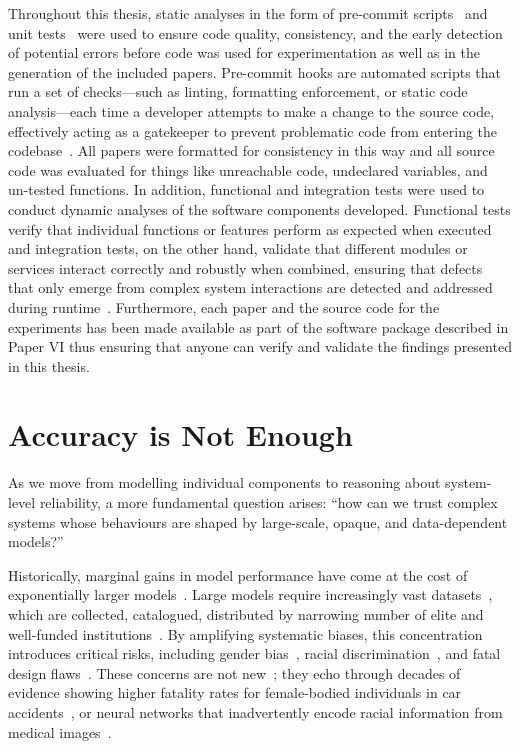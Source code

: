 Throughout this thesis, static analyses in the form of pre-commit scripts~\cite{precommit} and unit tests~\cite{testautomation} were used to ensure code quality, consistency, and the early detection of potential errors before code was used for experimentation as well as in the generation of the included papers. 
Pre-commit hooks are automated scripts that run a set of checks---such as linting, formatting enforcement, or static code analysis---each time a developer attempts to make a change to the source code, effectively acting as a gatekeeper to prevent problematic code from entering the codebase~\cite{precommit}.
All papers were formatted for consistency in this way and all source code was evaluated for things like unreachable code, undeclared variables, and un-tested functions.
In addition, functional and integration tests were used to conduct dynamic analyses of the software components developed. 
Functional tests verify that individual functions or features perform as expected when executed and integration tests, on the other hand, validate that different modules or services interact correctly and robustly when combined, ensuring that defects that only emerge from complex system interactions are detected and addressed during runtime~\cite{wang2006software}.
Furthermore, each paper and the source code for the experiments has been made available as part of the software package described in Paper VI thus ensuring that anyone can verify and validate the findings presented in this thesis. 

\section{Accuracy is Not Enough}

As we move from modelling individual components to reasoning about system-level reliability, a more fundamental question arises: ``how can we trust complex systems whose behaviours are shaped by large-scale, opaque, and data-dependent models?''

Historically, marginal gains in model performance have come at the cost of exponentially larger models~\cite{desislavov2021compute}. 
Large models require increasingly vast datasets~\cite{desislavov2021compute,vapnik1994measuring,blumer1989learnability}, which are collected, catalogued, distributed by narrowing number of elite and well-funded institutions~\cite{koch2021reduced}. 
By amplifying systematic biases, this concentration introduces critical risks, including gender bias~\cite{lu2020gender}, racial discrimination~\cite{buolamwini2018gender}, and fatal design flaws~\cite{banks2018driver}. 
These concerns are not new~\cite{corsaro1982something,ramirez2000resource,buolamwini2018gender}; they echo through decades of evidence showing higher fatality rates for female-bodied individuals in car accidents~\cite{evans2001gender}, or neural networks that inadvertently encode racial information from medical images~\cite{gichoya2022ai}.


